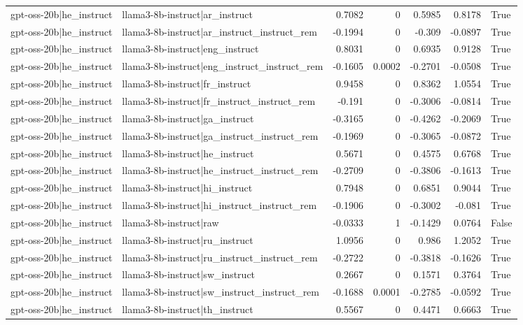 \begin{table}
\begin{tabular}{l l r r r r l}
gpt-oss-20b|he_instruct & llama3-8b-instruct|ar_instruct & 0.7082 & 0 & 0.5985 & 0.8178 & True \\
gpt-oss-20b|he_instruct & llama3-8b-instruct|ar_instruct_instruct_rem & -0.1994 & 0 & -0.309 & -0.0897 & True \\
gpt-oss-20b|he_instruct & llama3-8b-instruct|eng_instruct & 0.8031 & 0 & 0.6935 & 0.9128 & True \\
gpt-oss-20b|he_instruct & llama3-8b-instruct|eng_instruct_instruct_rem & -0.1605 & 0.0002 & -0.2701 & -0.0508 & True \\
gpt-oss-20b|he_instruct & llama3-8b-instruct|fr_instruct & 0.9458 & 0 & 0.8362 & 1.0554 & True \\
gpt-oss-20b|he_instruct & llama3-8b-instruct|fr_instruct_instruct_rem & -0.191 & 0 & -0.3006 & -0.0814 & True \\
gpt-oss-20b|he_instruct & llama3-8b-instruct|ga_instruct & -0.3165 & 0 & -0.4262 & -0.2069 & True \\
gpt-oss-20b|he_instruct & llama3-8b-instruct|ga_instruct_instruct_rem & -0.1969 & 0 & -0.3065 & -0.0872 & True \\
gpt-oss-20b|he_instruct & llama3-8b-instruct|he_instruct & 0.5671 & 0 & 0.4575 & 0.6768 & True \\
gpt-oss-20b|he_instruct & llama3-8b-instruct|he_instruct_instruct_rem & -0.2709 & 0 & -0.3806 & -0.1613 & True \\
gpt-oss-20b|he_instruct & llama3-8b-instruct|hi_instruct & 0.7948 & 0 & 0.6851 & 0.9044 & True \\
gpt-oss-20b|he_instruct & llama3-8b-instruct|hi_instruct_instruct_rem & -0.1906 & 0 & -0.3002 & -0.081 & True \\
gpt-oss-20b|he_instruct & llama3-8b-instruct|raw & -0.0333 & 1 & -0.1429 & 0.0764 & False \\
gpt-oss-20b|he_instruct & llama3-8b-instruct|ru_instruct & 1.0956 & 0 & 0.986 & 1.2052 & True \\
gpt-oss-20b|he_instruct & llama3-8b-instruct|ru_instruct_instruct_rem & -0.2722 & 0 & -0.3818 & -0.1626 & True \\
gpt-oss-20b|he_instruct & llama3-8b-instruct|sw_instruct & 0.2667 & 0 & 0.1571 & 0.3764 & True \\
gpt-oss-20b|he_instruct & llama3-8b-instruct|sw_instruct_instruct_rem & -0.1688 & 0.0001 & -0.2785 & -0.0592 & True \\
gpt-oss-20b|he_instruct & llama3-8b-instruct|th_instruct & 0.5567 & 0 & 0.4471 & 0.6663 & True \\

\end{tabular}
\end{table}
